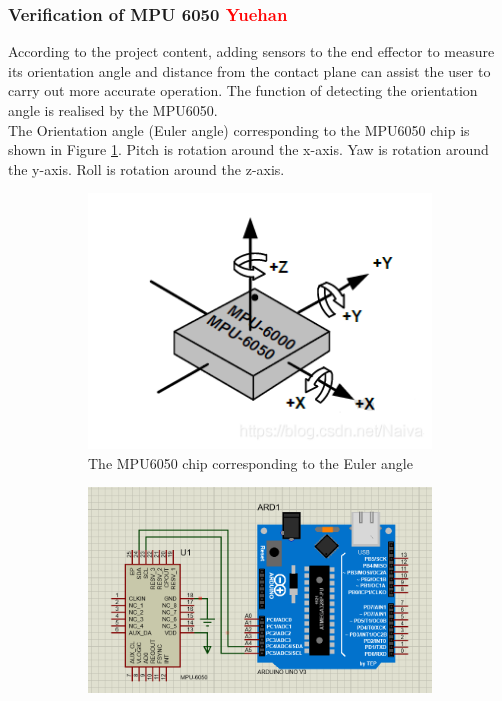 \subsubsection{Verification of MPU 6050 \textcolor{red}{Yuehan}}
According to the project content, adding sensors to the end effector to measure its orientation angle and distance 
from the contact plane can assist the user to carry out more accurate operation. The function of detecting the 
orientation angle is realised by the MPU6050. \\
The Orientation angle (Euler angle) corresponding to the MPU6050 chip is shown in Figure \ref{fig:mpu6050_chip}. 
Pitch is rotation around the x-axis. Yaw is rotation around the y-axis. Roll is rotation around the z-axis. 
\begin{figure}[H] %
    \centering
    \captionsetup{labelsep=colon}
    \begin{subfigure}{0.45\textwidth} %
        \centering
        \includegraphics[width=\linewidth]{Image/Design/MPU6050_chip.png}
        \caption{\centering The MPU6050 chip corresponding to the Euler angle}
        \label{fig:mpu6050_chip}
    \end{subfigure}
    \begin{subfigure}{0.45\textwidth} %
        \centering
        \includegraphics[width=\linewidth]{Image/Design/MPU6050_circuit.png}

\end{subfigure}
\end{figure}
